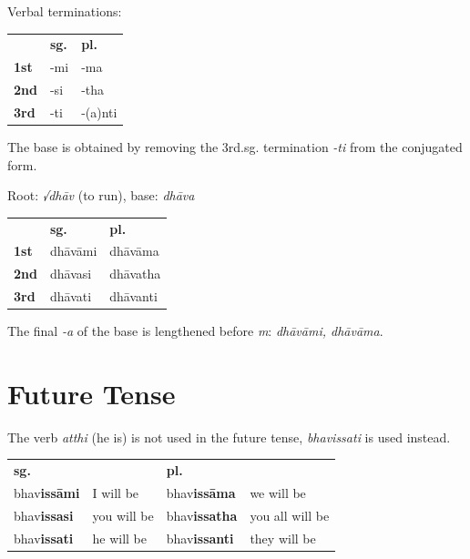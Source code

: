 \documentclass[a4paper]{memoir}
\begin{document}
{\centering\par
\begin{multicols}{2}

Verbal terminations:

\begin{center}
\begin{tabular}{lll}
 & \textbf{sg.} & \textbf{pl.}\\[0pt]
\textbf{1st} & -mi & -ma\\[0pt]
\textbf{2nd} & -si & -tha\\[0pt]
\textbf{3rd} & -ti & -(a)nti\\[0pt]
\end{tabular}
\end{center}

The base is obtained by removing the 3rd.sg. termination \emph{-ti} from the conjugated form.

\columnbreak

Root: \emph{√dhāv} (to run), base: \emph{dhāva}

\begin{center}
\begin{tabular}{lll}
 & \textbf{sg.} & \textbf{pl.}\\[0pt]
\textbf{1st} & dhāvāmi & dhāvāma\\[0pt]
\textbf{2nd} & dhāvasi & dhāvatha\\[0pt]
\textbf{3rd} & dhāvati & dhāvanti\\[0pt]
\end{tabular}
\end{center}

The final \emph{-a} of the base is lengthened before \emph{m}: \emph{dhāvāmi, dhāvāma}.

\end{multicols}
\par}

\section{Future Tense}
\label{sec:org5ecbe86}

The verb \emph{atthi} (he is) is not used in the future tense, \emph{bhavissati} is used instead.

\begin{center}
\begin{tabular}{llll}
\textbf{sg.} &  & \textbf{pl.} & \\[0pt]
bhav\textbf{issāmi} & I will be & bhav\textbf{issāma} & we will be\\[0pt]
bhav\textbf{issasi} & you will be & bhav\textbf{issatha} & you all will be\\[0pt]
bhav\textbf{issati} & he will be & bhav\textbf{issanti} & they will be\\[0pt]
\end{tabular}
\end{center}
\end{document}
